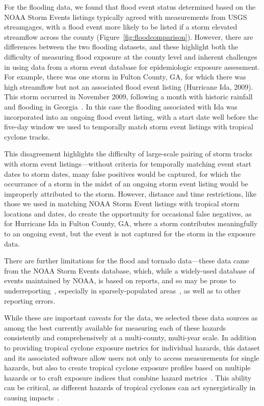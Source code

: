 For the flooding data, we found that flood event status determined based on the
NOAA Storm Events listings typically agreed with measurements from \ac{USGS}
streamgages, with a flood event more likely to be listed if a storm elevated
streamflow across the county (Figure~\ref{fig:floodcomparison}).  However,
there are differences between the two flooding datasets, and these highlight
both the difficulty of measuring flood exposure at the county level and
inherent challenges in using data from a storm event database for epidemiologic
exposure assessment.  For example, there was one storm in Fulton County, GA,
for which there was high streamflow but not an associated flood event listing
(Hurricane Ida, 2009).  This storm occurred in November 2009, following a month
with historic rainfall and flooding in
Georgia~\parencite{shepherd2011overview}.  In this case the flooding
associated with Ida was incorporated into an ongoing flood event listing, with
a start date well before the five-day window we used to temporally match storm
event listings with tropical cyclone tracks. 

This disagreement highlights the difficulty of large-scale pairing of storm
tracks with storm event listings---without criteria for temporally matching
event start dates to storm dates, many false positives would be
captured, for which the occurrance of a storm in the midst of an ongoing storm
event listing would be improperly attributed to the storm.  However, distance
and time restrictions, like those we used in matching NOAA Storm Event listings
with tropical storm locations and dates, do create the opportunity for
occasional false negatives, as for Hurricane Ida in Fulton County, GA, where a
storm contributes meaningfully to an ongoing event, but the event is not
captured for the storm in the exposure data.  

There are further limitations for the flood and tornado data---these data came
from the \ac{NOAA} Storm Events database, which, while a widely-used database
of events maintained by \ac{NOAA}, is based on reports, and so may be prone to
underreporting~\parencite{Ashley2008flood, Curran2000}, especially in
sparsely-populated areas~\parencite{Witt1998, Ashley2007}, as well as to other
reporting errors. 

While these are important caveats for the data, we selected these data sources
as among the best currently available for measuring each of these hazards
consistently and comprehensively at a multi-county, multi-year scale. In
addition to providing tropical cyclone exposure metrics for individual hazards,
this dataset and its associated software allow users not only to access
measurements for single hazards, but also to create tropical cyclone exposure
profiles based on multiple hazards or to craft exposure indices that combine
hazard metrics~\parencite{chakraborty2005population, peduzzi2009assessing}.
This ability can be critical, as different hazards of tropical cyclones can
act synergistically in causing impacts~\parencite{smith2009}.  


